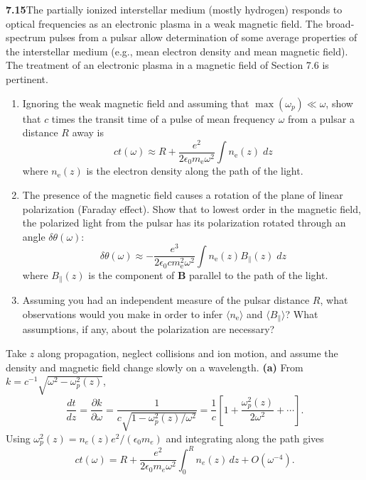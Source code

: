 \par\bigskip
\noindent\textbf{7.15}\quad The partially ionized interstellar medium (mostly hydrogen) responds to optical frequencies as an electronic plasma in a weak magnetic field. The broad-spectrum pulses from a pulsar allow determination of some average properties of the interstellar medium (e.g., mean electron density and mean magnetic field). The treatment of an electronic plasma in a magnetic field of Section 7.6 is pertinent.
\begin{enumerate}
\item[(a)] Ignoring the weak magnetic field and assuming that $\max(\omega_{p})\ll\omega$, show that $c$ times the transit time of a pulse of mean frequency $\omega$ from a pulsar a distance $R$ away is
\[
ct(\omega)\approx R+\frac{e^{2}}{2\epsilon_{0}m_{\mathrm{e}}\omega^{2}}\int n_{\mathrm{e}}(z)\;dz
\]
where $n_{\mathrm{e}}(z)$ is the electron density along the path of the light.
\item[(b)] The presence of the magnetic field causes a rotation of the plane of linear polarization (Faraday effect). Show that to lowest order in the magnetic field, the polarized light from the pulsar has its polarization rotated through an angle $\delta\theta(\omega)$:
\[
\delta\theta(\omega)\approx-\frac{e^{3}}{2\epsilon_{0}cm_{\mathrm{e}}^{2}\omega^{2}}\int n_{\mathrm{e}}(z)B_{\parallel}(z)\;dz
\]
where $B_{\parallel}(z)$ is the component of $\mathbf{B}$ parallel to the path of the light. 
\item[(c)] Assuming you had an independent measure of the pulsar distance $R$, what observations would you make in order to infer $\langle n_{\mathrm{e}}\rangle$ and $\langle B_{\parallel}\rangle$? What assumptions, if any, about the polarization are necessary?
\end{enumerate}
\solution
Take $z$ along propagation, neglect collisions and ion motion, and
assume the density and magnetic field change slowly on a wavelength.
\textbf{(a)} From $k=c^{-1}\sqrt{\omega^2-\omega_p^2(z)}$,
\[
\frac{dt}{dz}=\frac{\partial k}{\partial\omega}
=\frac1{c\sqrt{1-\omega_p^2(z)/\omega^2}}
=\frac1c\left[1+\frac{\omega_p^2(z)}{2\omega^2}+\cdots\right].
\]
Using $\omega_p^2(z)=n_e(z)e^2/(\epsilon_0m_e)$ and integrating
along the path gives
\[
\boxed{ct(\omega)=R+\frac{e^2}{2\epsilon_0m_e\omega^2}
\int_0^R n_e(z)\,dz+O(\omega^{-4}).}
\]
